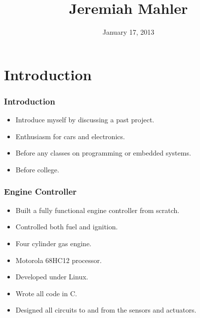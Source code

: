 \documentclass[gray]{beamer}
\title{Jeremiah Mahler}
\institute{California State University Chico}
\date{\small{January 17, 2013}}
\begin{document}
\frame{\titlepage}



\section{Introduction}

\begin{frame}
\frametitle{Introduction}
\begin{itemize}
\item Introduce myself by discussing a past project.
\item Enthusiasm for cars and electronics.
\item Before any classes on programming or embedded systems.
\item Before college.
\end{itemize}
\end{frame}


\begin{frame}
\frametitle{Engine Controller}
\begin{itemize}
\item Built a fully functional engine controller from scratch.
\item Controlled both fuel and ignition.
\item Four cylinder gas engine.
\item Motorola 68HC12 processor.
\item Developed under Linux.
\item Wrote all code in C.
\item Designed all circuits to and from the sensors and actuators.
\end{itemize}
\end{frame}
\end{document}

